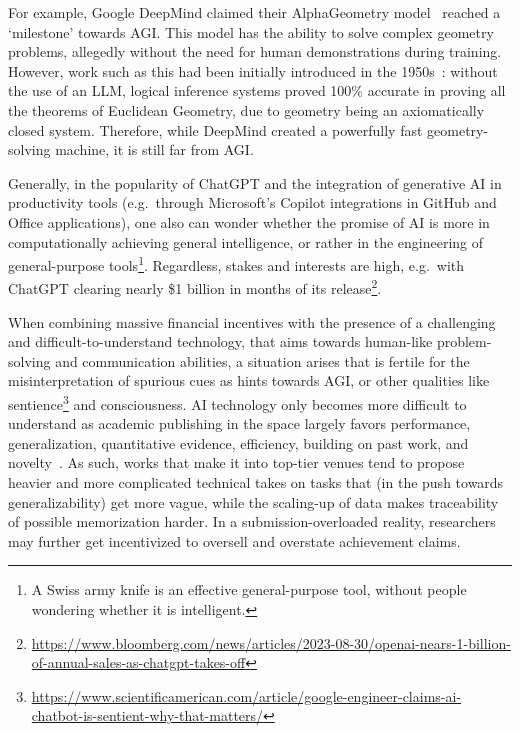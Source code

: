 \documentclass{article}
\theoremstyle{plain}
\theoremstyle{definition}
\theoremstyle{remark}
\begin{document}
For example, Google DeepMind claimed their AlphaGeometry model~\cite{trinh2024geometry} reached a `milestone' towards AGI. This model has the ability to solve complex geometry problems, allegedly without the need for human demonstrations during training. However, work such as this had been initially introduced in the 1950s~\cite{hector2024linkedin}: without the use of an LLM, logical inference systems proved 100\% accurate in proving all the theorems of Euclidean Geometry, due to geometry being an axiomatically closed system. Therefore, while DeepMind created a powerfully fast geometry-solving machine, it is still far from AGI.%

Generally, in the popularity of ChatGPT and the integration of generative AI in productivity tools (e.g.\ through Microsoft's Copilot integrations in GitHub and Office applications), one also can wonder whether the promise of AI is more in computationally achieving general intelligence, or rather in the engineering of general-purpose tools\footnote{A Swiss army knife is an effective general-purpose tool, without people wondering whether it is intelligent.}. Regardless, stakes and interests are high, e.g.\ with ChatGPT clearing nearly \$1 billion in months of its release\footnote{\url{https://www.bloomberg.com/news/articles/2023-08-30/openai-nears-1-billion-of-annual-sales-as-chatgpt-takes-off}}.

When combining massive financial incentives with the presence of a challenging and difficult-to-understand technology, that aims towards human-like problem-solving and communication abilities, a situation arises that is fertile for the misinterpretation of spurious cues as hints towards AGI, or other qualities like sentience\footnote{\url{https://www.scientificamerican.com/article/google-engineer-claims-ai-chatbot-is-sentient-why-that-matters/}} and consciousness. AI technology only becomes more difficult to understand as academic publishing in the space largely favors performance, generalization, quantitative evidence, efficiency, building on past work, and novelty~\cite{values_in_ML}. As such, works that make it into top-tier venues tend to propose heavier and more complicated technical takes on tasks that (in the push towards generalizability) get more vague, while the scaling-up of data makes traceability of possible memorization harder. In a submission-overloaded reality, researchers may further get incentivized to oversell and overstate achievement claims.
\end{document}
